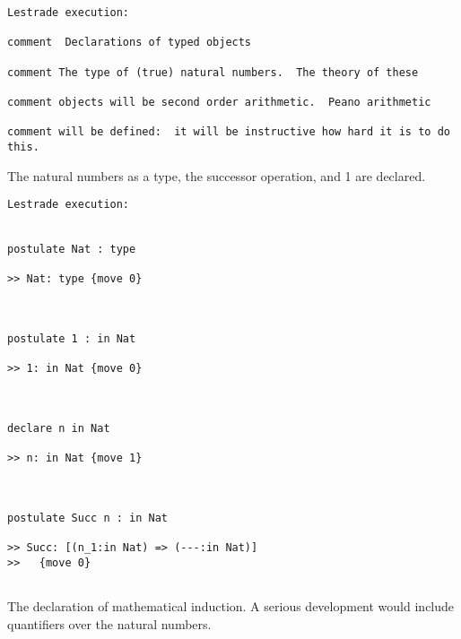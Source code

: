 \documentclass[12pt]{article}
\begin{document}
\begin{verbatim}Lestrade execution:

comment  Declarations of typed objects

comment The type of (true) natural numbers.  The theory of these

comment objects will be second order arithmetic.  Peano arithmetic

comment will be defined:  it will be instructive how hard it is to do this.

\end{verbatim}

The natural numbers as a type, the successor operation, and 1 are declared.

\begin{verbatim}Lestrade execution:


postulate Nat : type

>> Nat: type {move 0}



postulate 1 : in Nat

>> 1: in Nat {move 0}



declare n in Nat

>> n: in Nat {move 1}



postulate Succ n : in Nat

>> Succ: [(n_1:in Nat) => (---:in Nat)]
>>   {move 0}


\end{verbatim}

The declaration of mathematical induction.   A serious development would include quantifiers over the natural numbers.
\end{document}
